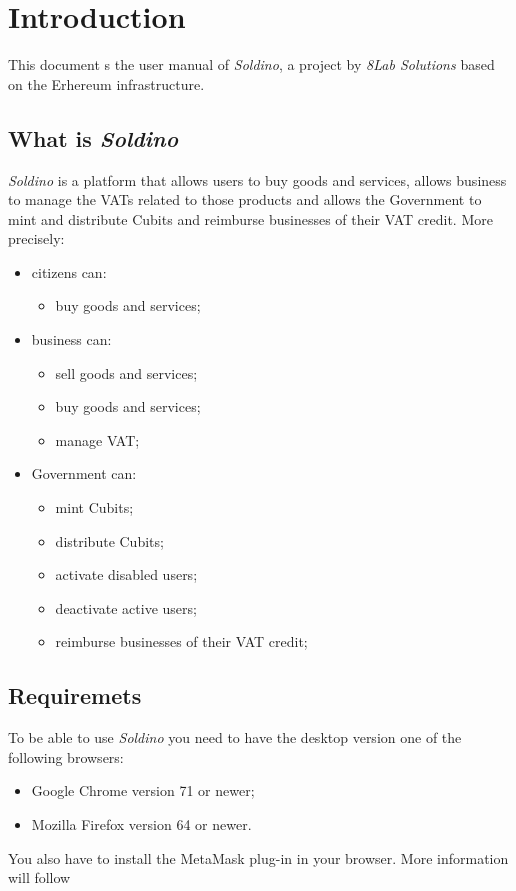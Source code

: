 \section{Introduction} 
	This document s the user manual of \textit{Soldino}, a project by 
	\textit{8Lab Solutions} based on the Erhereum infrastructure. 
	\subsection{What is \textit{Soldino}}
	\textit{Soldino} is a platform that allows 
	users to buy goods and services, allows business to manage the VATs 
	related to those products and allows the Government to mint and distribute
	Cubits and reimburse businesses of their VAT credit.
	More precisely:
	\begin{itemize}
		\item citizens can:
		\begin{itemize}
			\item  buy goods and services;
		\end{itemize}
		\item business can:
		\begin{itemize}
			\item sell goods and services;
			\item buy goods and services;
			\item manage VAT;
		\end{itemize}
		\item Government can:
		\begin{itemize}
			\item mint Cubits;
			\item distribute Cubits;
			\item activate disabled users;
			\item deactivate active users;
			\item reimburse businesses of their VAT credit;
		\end{itemize}
	\end{itemize}

\subsection{Requiremets}
	To be able to use \textit{Soldino} you need to have the desktop version one 
	of the following browsers:
	\begin{itemize}
		\item Google Chrome version 71 or newer;
		\item Mozilla Firefox version 64 or newer.
	\end{itemize}
	You also have to install the MetaMask plug-in in your browser. More information 
	will follow 